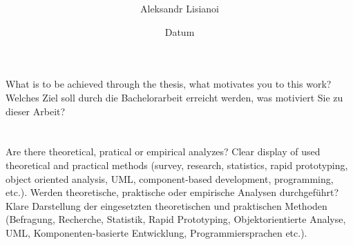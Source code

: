 \documentclass[a4paper,10pt,english]{INSOexpose}
\title{
	\langchooser{
		Preliminary thesis title
	}{
		Vorl\"aufiger Arbeitstitel der Arbeit
	}
}
\author{Aleksandr Lisianoi}
\date{Datum}
\begin{document}
\maketitle

\section{}


\section{}

\langchooser
{
	What is to be achieved through the thesis, what motivates you to this work?
}
{
	Welches Ziel soll durch die Bachelorarbeit erreicht werden, was motiviert Sie zu dieser Arbeit? 
}

\section{}

\langchooser
{
	Are there theoretical, pratical or empirical analyzes? Clear display of used theoretical and practical methods (survey, research, statistics, rapid prototyping, object oriented analysis, UML, component-based development, programming, etc.).
}
{
	Werden theoretische, praktische oder empirische Analysen durchgeführt? Klare Darstellung der eingesetzten theoretischen und praktischen Methoden (Befragung, Recherche, Statistik, 	Rapid Prototyping, Objektorientierte Analyse, UML, Komponenten-basierte Entwicklung, Programmiersprachen etc.).
}

\end{document}
